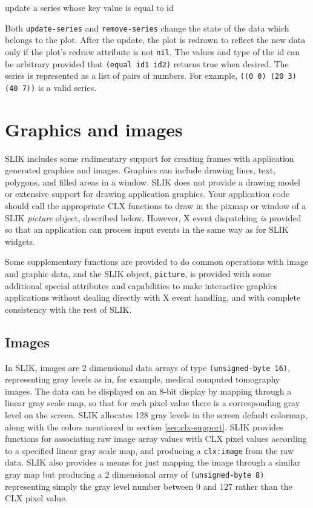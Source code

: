 \documentclass[twoside,openright,11pt]{report}
\newcommand{\tp}[1]{\texttt{#1}}
\begin{document}
{update a series whose key value is equal to id}

Both \tp{update-series} and \tp{remove-series} change the
state of the data which belongs to the plot.  After the update, the
plot is redrawn to reflect the new data only if the plot's redraw
attribute is not \tp{nil}.  The values and type of the id can be
arbitrary provided that \tp{(equal id1 id2)} returns true when
desired. The series is represented as a list of pairs of numbers.  For
example, \tp{((0 0) (20 3) (40 7))} is a valid series.

\chapter{Graphics and images}

SLIK includes some rudimentary support for creating frames with
application generated graphics and images.  Graphics
can include drawing lines, text, polygons, and filled areas in a
window.  SLIK does not provide a drawing model or extensive support
for drawing application graphics.  Your application code should call
the appropriate CLX functions to draw in the pixmap or window of a
SLIK \emph{picture} object, described below.  However, X event
dispatching \emph{is} provided so that an application can process
input events in the same way as for SLIK widgets.

Some supplementary functions are provided to do common operations with
image and graphic data, and the SLIK object, \tp{picture}, is
provided with some additional special attributes and capabilities to
make interactive graphics applications without dealing directly with X
event handling, and with complete consistency with the rest of SLIK.

\section{Images}

In SLIK, images are 2 dimensional data arrays of type
\tp{(unsigned-byte~16)}, representing gray levels as in, for
example, medical computed tomography images.  The data can be
displayed on an 8-bit display by mapping through a linear gray scale
map, so that for each pixel value there is a corresponding gray level
on the screen.  SLIK allocates 128 gray levels in the screen default
colormap, along with the colors mentioned in section
\ref{sec:clx-support}.  SLIK provides functions for associating raw
image array values with CLX pixel values according to a specified
linear gray scale map, and producing a \tp{clx:image} from the raw
data.  SLIK also provides a means for just mapping the image through a
similar gray map but producing a 2 dimensional array of
\tp{(unsigned-byte~8)} representing simply the gray level number
between 0 and 127 rather than the CLX pixel value.
\end{document}
